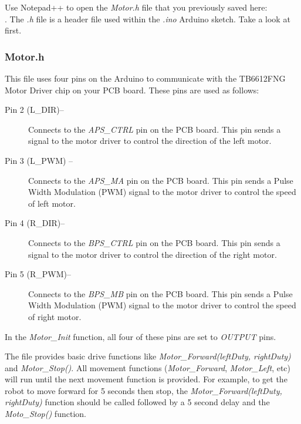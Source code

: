 \documentclass{handout}
\begin{document}
	
	Use Notepad++ to open the \textit{Motor.h} file that you previously saved here:\\ . The \textit{.h} file is a header file used within the \textit{.ino}  Arduino sketch. Take a look at  first.

	\newpage
\clearpage
\pagebreak	

	\subsubsection{Motor.h}
	This file uses four pins on the Arduino to communicate with the TB6612FNG Motor Driver chip on your PCB board. These pins are used as follows:
	
	\begin{description}
		\item[Pin 2 (L\_DIR)--] Connects to the \textit{APS\_CTRL} pin on the PCB board. This pin sends a signal to the motor driver to control the direction of the left motor.
		
		\item[Pin 3 (L\_PWM) --] Connects to the \textit{APS\_MA} pin on the PCB board. This pin sends a Pulse Width Modulation (PWM) signal to the motor driver to control the speed of left motor.
		
		\item[Pin 4 (R\_DIR)--] Connects to the \textit{BPS\_CTRL} pin on the PCB board. This pin sends a signal to the motor driver to control the direction of the right motor.
		
		\item[Pin 5 (R\_PWM)--] Connects to the \textit{BPS\_MB} pin on the PCB board. This pin sends a Pulse Width Modulation (PWM) signal to the motor driver to control the speed of right motor.
		
	\end{description}
	
	In the \textit{Motor\_Init} function, all four of these pins are set to \textit{OUTPUT} pins. 
	
	The  file provides basic drive functions like \textit{Motor\_Forward(leftDuty, rightDuty)} and \textit{Motor\_Stop()}. All movement functions (\textit{Motor\_Forward}, \textit{Motor\_Left}, etc) will run until the next movement function is provided. For example, to get the robot to move forward for 5 seconds then stop, the \textit{Motor\_Forward(leftDuty, rightDuty)} function should be called followed by a 5 second delay and the \textit{Moto\_Stop()} function.
	
\end{document}
